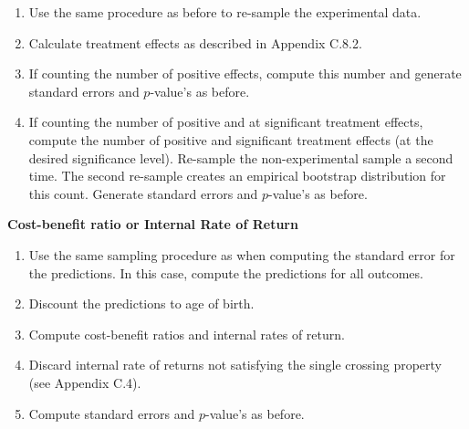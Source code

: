 \documentclass[static]{JJH-Beamer}
\begin{document}
\begin{frame}

\begin{enumerate}
\item Use the same procedure as before to re-sample the experimental data.
\item Calculate treatment effects as described in Appendix C.8.2.
\item If counting the number of positive effects, compute this number and generate standard errors and $p$-value's as before.
\item If counting the number of positive and at significant treatment effects, compute the number of positive and significant treatment effects (at the desired significance level). Re-sample the non-experimental sample a second time. The second re-sample creates an empirical bootstrap distribution for this count. Generate standard errors and $p$-value's as before.
\end{enumerate}

\end{frame}

\clearpage

\begin{frame}

\begin{center}
\textbf{Cost-benefit ratio or Internal Rate of Return}
\end{center}

\end{frame}

\begin{frame}

\begin{enumerate}

\item Use the same sampling procedure as when computing the standard error for the predictions. In this case, compute the predictions for all outcomes.
\item Discount the predictions to age of birth.
\item Compute cost-benefit ratios and internal rates of return.
\item Discard internal rate of returns not satisfying the single crossing property (see Appendix C.4).
\item Compute standard errors and $p$-value's as before.
\end{enumerate}

\end{frame}
\end{document}
